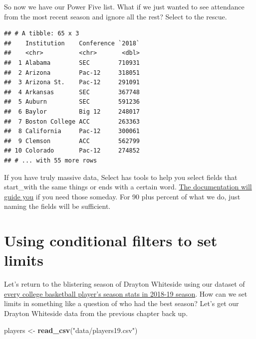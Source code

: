\documentclass[
]{book}
\newenvironment{Shaded}{\begin{snugshade}}{\end{snugshade}}
\newcommand{\DataTypeTok}[1]{\textcolor[rgb]{0.13,0.29,0.53}{#1}}
\newcommand{\KeywordTok}[1]{\textcolor[rgb]{0.13,0.29,0.53}{\textbf{#1}}}
\newcommand{\NormalTok}[1]{#1}
\newcommand{\OperatorTok}[1]{\textcolor[rgb]{0.81,0.36,0.00}{\textbf{#1}}}
\newcommand{\StringTok}[1]{\textcolor[rgb]{0.31,0.60,0.02}{#1}}
\begin{document}
So now we have our Power Five list. What if we just wanted to see attendance from the most recent season and ignore all the rest? Select to the rescue.

\begin{Shaded}
\end{Shaded}

\begin{verbatim}
## # A tibble: 65 x 3
##    Institution    Conference `2018`
##    <chr>          <chr>       <dbl>
##  1 Alabama        SEC        710931
##  2 Arizona        Pac-12     318051
##  3 Arizona St.    Pac-12     291091
##  4 Arkansas       SEC        367748
##  5 Auburn         SEC        591236
##  6 Baylor         Big 12     248017
##  7 Boston College ACC        263363
##  8 California     Pac-12     300061
##  9 Clemson        ACC        562799
## 10 Colorado       Pac-12     274852
## # ... with 55 more rows
\end{verbatim}

If you have truly massive data, Select has tools to help you select fields that start\_with the same things or ends with a certain word. \href{https://dplyr.tidyverse.org/reference/select.html}{The documentation will guide you} if you need those someday. For 90 plus percent of what we do, just naming the fields will be sufficient.

\hypertarget{using-conditional-filters-to-set-limits}{%
\section{Using conditional filters to set limits}\label{using-conditional-filters-to-set-limits}}

Let's return to the blistering season of Drayton Whiteside using our dataset of \href{https://unl.box.com/s/u99ualyzrrzucunr9edd3m4gvgvorez6}{every college basketball player's season stats in 2018-19 season}. How can we set limits in something like a question of who had the best season? Let's get our Drayton Whiteside data from the previous chapter back up.

\begin{Shaded}
\begin{Highlighting}[]
\NormalTok{players <-}\StringTok{ }\KeywordTok{read_csv}\NormalTok{(}\StringTok{"data/players19.csv"}\NormalTok{)}
\end{Highlighting}
\end{Shaded}
\end{document}
